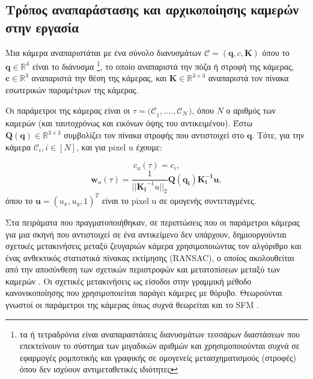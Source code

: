 \begin{appendices}
    \subsection*{Τρόπος αναπαράστασης και αρχικοποίησης καμερών στην εργασία}
    \label{appendix:camerainitrepresent}

    Μια κάμερα αναπαριστάται με ένα σύνολο  διανυσμάτων \(\mathcal{C} = (\boldsymbol{q},c,\boldsymbol{K})\) όπου το \(\boldsymbol{q} \in \mathbb{R}^4\) είναι το  διάνυσμα \footnote{τα  ή τετραδρόνια είναι αναπαραστάσεις διανυσμάτων τεσσάρων διαστάσεων που επεκτείνουν το σύστημα των μιγαδικών αριθμών και χρησιμοποιούνται συχνά σε εφαρμογές ρομποτικής και γραφικής σε ομογενείς μετασχηματισμούς (στροφές) όπου δεν ισχύουν αντιμεταθετικές ιδιότητες}, το οποίο αναπαριστά την πόζα ή στροφή της κάμερας, \(\boldsymbol{c} \in \mathbb{R}^3\) αναπαριστά την θέση της κάμερας, και \(\boldsymbol{K} \in \mathbb{R}^{3 \times 3}\) αναπαριστά τον πίνακα εσωτερικών παραμέτρων της κάμερας.

    Οι παράμετροι της κάμερας είναι οι \(\tau = \mathcal{(C}_{1}\mathcal{, .... , C_{N})}\), όπου \(N\) ο αριθμός των καμερών (και ταυτοχρόνως και εικόνων όψης του  αντικειμένου). Έστω \(\boldsymbol{Q(q)} \in \mathbb{R}^{3\times 3}\) συμβολίζει τον πίνακα στροφής που αντιστοιχεί στο  \(\boldsymbol{q}\). Τότε, για την κάμερα \(\mathcal{C}_{i}, i \in [N]\), και για pixel u έχουμε:

    \begin{equation}
        c_u(\tau) = c_i,
        \label{eq:camerapos}
    \end{equation}
    \begin{equation}
        \boldsymbol{w}_u(\tau) = \frac{1}{||\boldsymbol{K_{i}}^{-1}u||_{2}}\boldsymbol{Q(q_i)K_{i}^{-1}u},
        \label{eq:viewdir}
    \end{equation}
    όπου το \(\boldsymbol{u} = (u_{x},u_{y},1)^{T}\) είναι το pixel u σε ομογενής συντεταγμένες.


    Στα πειράματα που πραγματοποιήθηκαν, σε περιπτώσεις που οι παράμετροι κάμερας για μια σκηνή που αντιστοιχεί σε ένα  αντικείμενο δεν υπάρχουν, δημιουργούνται σχετικές μετακινήσεις μεταξύ ζευγαριών κάμερα χρησιμοποιώντας τον αλγόριθμο  \cite{lowe2004distinctive} και ένας ανθεκτικός στατιστικά πίνακας εκτίμησης (RANSAC), ο οποίος ακολουθείται από την αποσύνθεση των σχετικών περιστροφών και μετατοπίσεων μεταξύ των καμερών \cite{hartley2003multiple}. Οι σχετικές μετακινήσεις ως είσοδοι στην γραμμική μέθοδο κανονικοποίησης που χρησιμοποιείται \cite{jiang2013global} παράγει κάμερες με θόρυβο. Θεωρούνται γνωστοί οι παράμετροι της κάμερας όπως συχνά θεωρείται και το SFM \cite{schonberger2016structure}.
    

\end{appendices}

